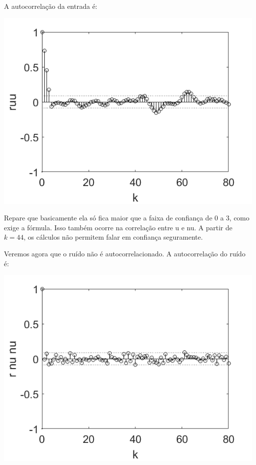 \documentclass{rbfin}
\begin{document}
\newpage

A autocorrelação da entrada é:

\begin{center}
\includegraphics[scale=0.666]{1ruu}
\end{center}

Repare que basicamente ela só fica maior que a faixa de confiança de $0$ a $3$, como exige a fórmula. Isso também ocorre na correlação entre u e nu. A partir de $k = 44$, os cálculos não permitem falar em confiança seguramente.

Veremos agora que o ruído não é autocorrelacionado. A autocorrelação do ruído é:

\begin{center}
\includegraphics[scale=0.666]{1rnunu}
\end{center}
\end{document}
